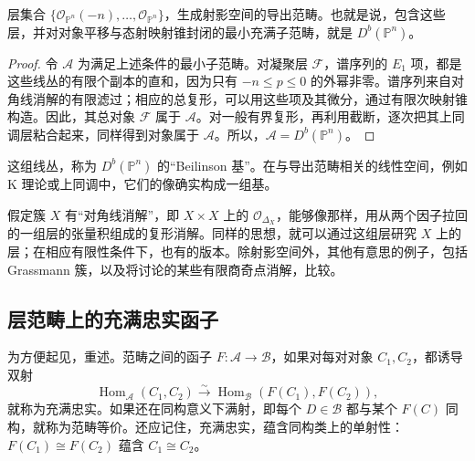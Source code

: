 \begin{corollary}\label{cor:4.73}
层集合 $\{\mathcal{O}_{\mathbb{P}^n}(-n),\ldots,\mathcal{O}_{\mathbb{P}^n}\}$，生成射影空间的导出范畴。也就是说，包含这些层，并对对象平移与态射映射锥封闭的最小充满子范畴，就是 $D^b(\mathbb{P}^n)$。
\end{corollary}
\begin{proof}
令 $\mathcal{A}$ 为满足上述条件的最小子范畴。对凝聚层 $\mathcal{F}$，谱序列的 $E_1$ 项，都是这些线丛的有限个副本的直和，因为只有 $-n\le p\le0$ 的外幂非零。谱序列来自对角线消解的有限滤过；相应的总复形，可以用这些项及其微分，通过有限次映射锥构造。因此，其总对象 $\mathcal{F}$ 属于 $\mathcal{A}$。对一般有界复形，再利用截断，逐次把其上同调层粘合起来，同样得到对象属于 $\mathcal{A}$。所以，$\mathcal{A}=D^b(\mathbb{P}^n)$。\BookQED
\end{proof}

这组线丛，称为 $D^b(\mathbb{P}^n)$ 的“Beilinson 基”。在与导出范畴相关的线性空间，例如 K 理论或上同调中，它们的像确实构成一组基。

\begin{note}[74]\label{note:4.74}
假定簇 $X$ 有“对角线消解”，即 $X\times X$ 上的 $\mathcal{O}_{\Delta_X}$，能够像那样，用从两个因子拉回的一组层的张量积组成的复形消解。同样的思想，就可以通过这组层研究 $X$ 上的层；在相应有限性条件下，也有的版本。除射影空间外，其他有意思的例子，包括 Grassmann 簇，以及将讨论的某些有限商奇点消解，比较。
\end{note}

\subsection{层范畴上的充满忠实函子}\label{sec:4.6.3}

为方便起见，重述。范畴之间的函子 $F\colon\mathcal{A}\to\mathcal{B}$，如果对每对对象 $C_1,C_2$，都诱导双射
\[
\operatorname{Hom}_{\mathcal{A}}(C_1,C_2)
\xrightarrow{\sim}\operatorname{Hom}_{\mathcal{B}}(F(C_1),F(C_2)),
\]
就称为充满忠实。如果还在同构意义下满射，即每个 $D\in\mathcal{B}$ 都与某个 $F(C)$ 同构，就称为范畴等价。还应记住，充满忠实，蕴含同构类上的单射性：$F(C_1)\cong F(C_2)$ 蕴含 $C_1\cong C_2$。

